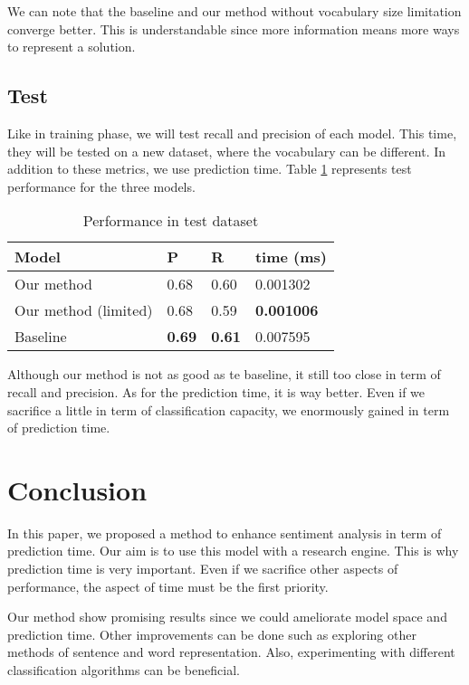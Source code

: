 \documentclass[conference]{IEEEtran}
\begin{document}
We can note that the baseline and our method without vocabulary size limitation converge better.
This is understandable since more information means more ways to represent a solution.
 

\subsection{Test}

Like in training phase, we will test recall and precision of each model.
This time, they will be tested on a new dataset, where the vocabulary can be different.
In addition to these metrics, we use prediction time.
Table \ref{tab:test} represents test performance for the three models.

\begin{table}[htbp]
	\caption{Performance in test dataset}
	\begin{center}
		\begin{tabular}{llll}
			\hline\hline
			\textbf{Model} & \textbf{P} & \textbf{R} & \textbf{time (ms)} \\
			\hline
			Our method           & 0.68 & 0.60 & 0.001302\\
			Our method (limited) & 0.68 & 0.59 & \textbf{0.001006} \\
			\hline
			Baseline             & \textbf{0.69} & \textbf{0.61} & 0.007595 \\
			\hline\hline
		\end{tabular}
		\label{tab:test}
	\end{center}
\end{table}

Although our method is not as good as te baseline, it still too close in term of recall and precision.
As for the prediction time, it is way better.
Even if we sacrifice a little in term of classification capacity, we enormously gained in term of prediction time.

\section{Conclusion}

In this paper, we proposed a method to enhance sentiment analysis in term of prediction time.
Our aim is to use this model with a research engine.
This is why prediction time is very important.
Even if we sacrifice other aspects of performance, the aspect of time must be the first priority.

Our method show promising results since we could ameliorate model space and prediction time.
Other improvements can be done such as exploring other methods of sentence and word representation.
Also, experimenting with different classification algorithms can be beneficial.
\end{document}
